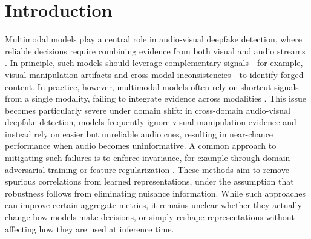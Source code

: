 \documentclass{article}
\begin{document}
\section{Introduction}
Multimodal models play a central role in audio-visual deepfake detection, where reliable decisions require combining evidence from both visual and audio streams \citep{zhou2021jointav, chung2016syncnet, feng2023avad, liang2024speechforensics, du2025cad}. In principle, such models should leverage complementary signals—for example, visual manipulation artifacts and cross-modal inconsistencies—to identify forged content. In practice, however, multimodal models often rely on shortcut signals from a single modality, failing to integrate evidence across modalities \citep{smeu2025avhalign, geirhos2020shortcut}. This issue becomes particularly severe under domain shift: in cross-domain audio-visual deepfake detection, models frequently ignore visual manipulation evidence and instead rely on easier but unreliable audio cues, resulting in near-chance performance when audio becomes uninformative.
A common approach to mitigating such failures is to enforce invariance, for example through domain-adversarial training \citep{ganin2016dann} or feature regularization \citep{sun2016deepcoral}. These methods aim to remove spurious correlations from learned representations, under the assumption that robustness follows from eliminating nuisance information. While such approaches can improve certain aggregate metrics, it remains unclear whether they actually change how models make decisions, or simply reshape representations without affecting how they are used at inference time.
\end{document}
